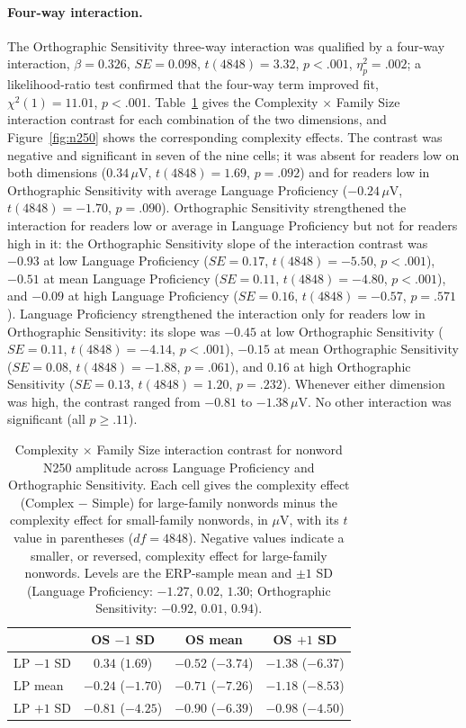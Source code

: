 \documentclass[utf8]{FrontiersinHarvard} %
\begin{document}
\paragraph*{Four-way interaction.} The Orthographic Sensitivity three-way interaction was qualified by a four-way interaction, $\beta = 0.326$, $SE = 0.098$, $t(4848) = 3.32$, $p < .001$, $\eta^2_p = .002$; a likelihood-ratio test confirmed that the four-way term improved fit, $\chi^2(1) = 11.01$, $p < .001$. Table~\ref{tab:n250nw} gives the Complexity $\times$ Family Size interaction contrast for each combination of the two dimensions, and Figure~\ref{fig:n250} shows the corresponding complexity effects. The contrast was negative and significant in seven of the nine cells; it was absent for readers low on both dimensions ($0.34\,\mu$V, $t(4848) = 1.69$, $p = .092$) and for readers low in Orthographic Sensitivity with average Language Proficiency ($-0.24\,\mu$V, $t(4848) = -1.70$, $p = .090$). Orthographic Sensitivity strengthened the interaction for readers low or average in Language Proficiency but not for readers high in it: the Orthographic Sensitivity slope of the interaction contrast was $-0.93$ at low Language Proficiency ($SE = 0.17$, $t(4848) = -5.50$, $p < .001$), $-0.51$ at mean Language Proficiency ($SE = 0.11$, $t(4848) = -4.80$, $p < .001$), and $-0.09$ at high Language Proficiency ($SE = 0.16$, $t(4848) = -0.57$, $p = .571$). Language Proficiency strengthened the interaction only for readers low in Orthographic Sensitivity: its slope was $-0.45$ at low Orthographic Sensitivity ($SE = 0.11$, $t(4848) = -4.14$, $p < .001$), $-0.15$ at mean Orthographic Sensitivity ($SE = 0.08$, $t(4848) = -1.88$, $p = .061$), and $0.16$ at high Orthographic Sensitivity ($SE = 0.13$, $t(4848) = 1.20$, $p = .232$). Whenever either dimension was high, the contrast ranged from $-0.81$ to $-1.38\,\mu$V. No other interaction was significant (all $p \geq .11$).

\begin{table}[htbp]
	\centering
	\small
	\caption{Complexity $\times$ Family Size interaction contrast for nonword N250 amplitude across Language Proficiency and Orthographic Sensitivity. Each cell gives the complexity effect (Complex $-$ Simple) for large-family nonwords minus the complexity effect for small-family nonwords, in $\mu$V, with its $t$ value in parentheses ($df = 4848$). Negative values indicate a smaller, or reversed, complexity effect for large-family nonwords. Levels are the ERP-sample mean and $\pm 1$ SD (Language Proficiency: $-1.27$, $0.02$, $1.30$; Orthographic Sensitivity: $-0.92$, $0.01$, $0.94$).}
	\label{tab:n250nw}
	\begin{tabular}{lccc}
		\toprule
		& OS $-1$ SD & OS mean & OS $+1$ SD \\
		\midrule
		LP $-1$ SD & $0.34$ ($1.69$) & $-0.52$ ($-3.74$) & $-1.38$ ($-6.37$) \\
		LP mean & $-0.24$ ($-1.70$) & $-0.71$ ($-7.26$) & $-1.18$ ($-8.53$) \\
		LP $+1$ SD & $-0.81$ ($-4.25$) & $-0.90$ ($-6.39$) & $-0.98$ ($-4.50$) \\
		\bottomrule
	\end{tabular}
\end{table}
\end{document}
